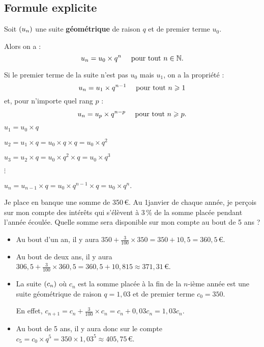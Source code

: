 \documentclass[a4paper,11pt]{article}
\begin{document}
\subsection{Formule explicite}

\begin{cprop}
Soit $\suiten$ une suite \textbf{géométrique} de raison $q$ et de premier terme $u_0$.

Alors on a :\[u_n=u_0\times q^n \quad  \text{ pour tout } n \in \N.\]
\end{cprop}

\begin{crmq}
Si le premier terme de la suite n'est pas $u_0$ mais $u_1$, on a la propriété : \[u_n=u_1 \times q^{n-1} \quad \text{ pour tout }n \pg 1\]%
et, pour n'importe quel rang $p$ : \[u_n=u_p \times q^{n-p} \quad \text{ pour tout }n \pg p.\]
\end{crmq}

\begin{cdemo}
$u_1=u_0\times q$

$u_2=u_1 \times q=u_0  \times q\times q=u_0\times q^2$

$u_3=u_2 \times q =u_0 \times q^2 \times q =u_0 \times q^3$

$\vdots$

$u_n=u_{n-1} \times q=u_0 \times q^{n-1}\times q = u_0 \times q^n$.
\end{cdemo}

\begin{cexemple}
Je place en banque une somme de 350\,€. Au 1\ier janvier de chaque année, je perçois sur mon compte des intérêts qui s'élèvent à 3\,\% de la somme placée pendant l'année écoulée.  Quelle somme sera disponible sur mon compte au bout de 5 ans ?
\begin{itemize}
	\item Au bout d'un an, il y aura $350+\frac{3}{100}\times 350=350+10,5=360,5$\,€.
	\item Au bout de deux ans, il y aura $306,5+\frac{3}{100}\times 360,5=360,5+10,815 \approx 371,31 $\,€.
	\item La suite $\suiten[c]$ où $c_n$ est la somme placée à la fin de la $n$-ième année est une suite géométrique de raison $q=1,03$ et de premier terme $c_0=350$.
	
	En effet, $c_{n+1}=c_n+\frac{3}{100} \times c_n=c_n+0,03c_n=1,03c_n$. 
	\item Au bout de 5 ans, il y aura donc sur le compte $c_{5}=c_0 \times q^ 5 = 350 \times 1,03^ 5 \approx 405,75 $\,€.
\end{itemize}
\end{cexemple}
\end{document}

